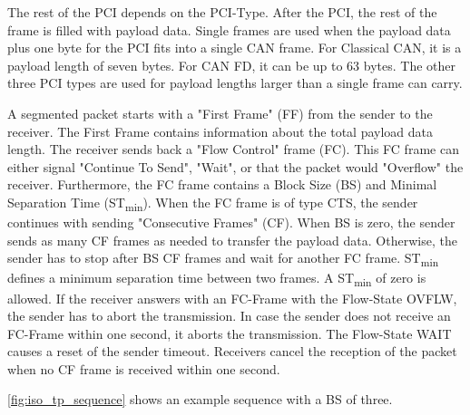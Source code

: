 The rest of the PCI depends on the PCI-Type.
After the PCI, the rest of the frame is filled with payload data.
Single frames are used when the payload data plus one byte for the PCI  fits into a single CAN frame.
For Classical CAN, it is a payload length of seven bytes. For CAN FD, it can be up to 63 bytes.
The other three PCI types are used for payload lengths larger than a single frame can carry.

A segmented packet starts with a "First Frame" (FF) from the sender to the receiver.
The First Frame contains information about the total payload data length.
The receiver sends back a "Flow Control" frame (FC).
This FC frame can either signal "Continue To Send", "Wait", or that the packet would "Overflow" the receiver.
Furthermore, the FC frame contains a Block Size (BS) and Minimal Separation Time (ST\textsubscript{min}).
When the FC frame is of type CTS, the sender continues with sending "Consecutive Frames" (CF).
When BS is zero, the sender sends as many CF frames as needed to transfer the payload data.
Otherwise, the sender has to stop after BS CF frames and wait for another FC frame.
ST\textsubscript{min} defines a minimum separation time between two frames.
A ST\textsubscript{min} of zero is allowed.
If the receiver answers with an FC-Frame with the Flow-State OVFLW, the sender has to abort the transmission.
In case the sender does not receive an FC-Frame within one second, it aborts the transmission.
The Flow-State WAIT causes a reset of the sender timeout.
Receivers cancel the reception of the packet when no CF frame is received within one second.

\autoref{fig:iso_tp_sequence} shows an example sequence with a BS of three.



